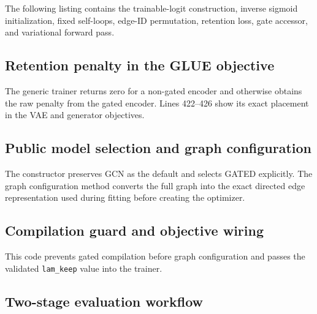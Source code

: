 \documentclass[11pt]{article}
\newcommand{\code}[1]{\texttt{#1}}
\begin{document}
The following listing contains the trainable-logit construction, inverse
sigmoid initialization, fixed self-loops, edge-ID permutation, retention loss,
gate accessor, and variational forward pass.



\subsection{Retention penalty in the GLUE objective}

The generic trainer returns zero for a non-gated encoder and otherwise obtains
the raw penalty from the gated encoder.  Lines 422--426 show its exact placement
in the VAE and generator objectives.




\subsection{Public model selection and graph configuration}

The constructor preserves GCN as the default and selects GATED explicitly.
The graph configuration method converts the full graph into the exact directed
edge representation used during fitting before creating the optimizer.




\subsection{Compilation guard and objective wiring}

This code prevents gated compilation before graph configuration and passes the
validated \code{lam\_keep} value into the trainer.



\subsection{Two-stage evaluation workflow}
\end{document}

